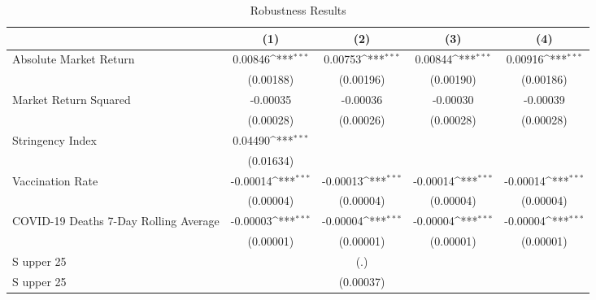 \begin{table}[htbp]\centering
\def\sym#1{\ifmmode^{#1}\else\(^{#1}\)\fi}
\caption{Robustness Results \label{reg2}}
\begin{tabular}{l*{4}{c}}
\toprule
                    &\multicolumn{1}{c}{(1)}         &\multicolumn{1}{c}{(2)}         &\multicolumn{1}{c}{(3)}         &\multicolumn{1}{c}{(4)}         \\
\midrule
Absolute Market Return&     0.00846\sym{***}&     0.00753\sym{***}&     0.00844\sym{***}&     0.00916\sym{***}\\
                    &   (0.00188)         &   (0.00196)         &   (0.00190)         &   (0.00186)         \\
\addlinespace
Market Return Squared&    -0.00035         &    -0.00036         &    -0.00030         &    -0.00039         \\
                    &   (0.00028)         &   (0.00026)         &   (0.00028)         &   (0.00028)         \\
\addlinespace
Stringency Index    &     0.04490\sym{***}&                     &                     &                     \\
                    &   (0.01634)         &                     &                     &                     \\
\addlinespace
Vaccination Rate    &    -0.00014\sym{***}&    -0.00013\sym{***}&    -0.00014\sym{***}&    -0.00014\sym{***}\\
                    &   (0.00004)         &   (0.00004)         &   (0.00004)         &   (0.00004)         \\
\addlinespace
COVID-19 Deaths 7-Day Rolling Average&    -0.00003\sym{***}&    -0.00004\sym{***}&    -0.00004\sym{***}&    -0.00004\sym{***}\\
                    &   (0.00001)         &   (0.00001)         &   (0.00001)         &   (0.00001)         \\
\addlinespace
S upper 25%
                    &                     &         (.)         &                     &                     \\
\addlinespace
S upper 25%
                    &                     &   (0.00037)         &                     &                     \\

\end{tabular}
\end{table}
